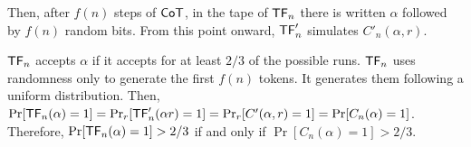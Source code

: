 Then, after $f(n)$ steps of $\mathsf{CoT}$, in the tape of $\mathsf{TF}_n$ there is written $\alpha$ followed by $f(n)$ random bits.
From this point onward, $\mathsf{TF}'_n$ simulates $C'_n(\alpha, r)$.

\medskip

$\mathsf{TF}_n$ accepts $\alpha$ if it accepts for at least $2/3$ of the possible runs.
$\mathsf{TF}_n$ uses randomness only to generate the first $f(n)$ tokens.
It generates them following a uniform distribution.
Then, $\Pr[\mathsf{TF}_n(\alpha) = 1] = \Pr_{r}[\mathsf{TF}'_n(\alpha r) = 1] = \Pr_{r}[C'(\alpha, r) = 1] = \Pr[C_n(\alpha) = 1]$.
Therefore, $\Pr[\mathsf{TF}_n(\alpha) = 1] > 2/3$ if and only if $\Pr[C_n(\alpha) = 1] > 2/3$.
